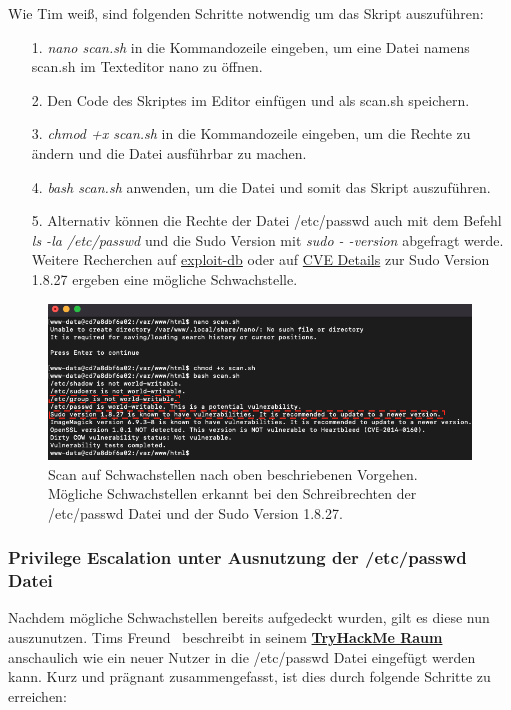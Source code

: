 \documentclass[10pt, a4paper,onecolumn ,titlepage]{article}
\begin{document}
    Wie Tim weiß, sind folgenden Schritte notwendig um das Skript auszuführen:
    \begin{enumerate}[leftmargin=2.5cm]
        \item[1.] \textit{nano scan.sh}  in die Kommandozeile eingeben, um eine Datei namens scan.sh im Texteditor nano zu öffnen.
        \item[2.] Den Code des Skriptes im Editor einfügen und als scan.sh speichern.
        \item[3.] \textit{chmod +x scan.sh}  in die Kommandozeile eingeben, um die Rechte zu ändern und die Datei ausführbar zu machen.
        \item[4.] \textit{bash scan.sh}  anwenden, um die Datei und somit das Skript auszuführen.
        \item[5.] Alternativ können die Rechte der Datei /etc/passwd auch mit dem Befehl \textit{ls -la /etc/passwd} und die Sudo Version mit \textit{sudo - -version} abgefragt werde.
        Weitere Recherchen auf \href{https://www.exploit-db.com/exploits/47502}{exploit-db} oder auf \href{https://www.cvedetails.com/cve/CVE-2019-14287/}{CVE Details} zur Sudo Version 1.8.27 ergeben eine mögliche Schwachstelle.
    \end{enumerate}


    \begin{figure}[H]
        \centering
        \includegraphics[width=1\textwidth]{storyline_bilder_vm2/ScanSchwachstellen}
        \caption{Scan auf Schwachstellen nach oben beschriebenen Vorgehen.
        Mögliche Schwachstellen erkannt bei den Schreibrechten der /etc/passwd Datei und der Sudo Version 1.8.27.}
        \label{fig:scan}
    \end{figure}
    \noindent



    \subsubsection{Privilege Escalation unter Ausnutzung der /etc/passwd Datei}
    \label{subsubsec:privilegeEscalation1}
    Nachdem mögliche Schwachstellen bereits aufgedeckt wurden, gilt es diese nun auszunutzen.
    Tims Freund~\textcite{privilegeEscalationRaumTryHackMe} beschreibt in seinem \href{https://tryhackme.com/room/linprivesc}{\textbf{TryHackMe Raum}} anschaulich wie ein neuer Nutzer in die /etc/passwd Datei eingefügt werden kann.
    Kurz und prägnant zusammengefasst, ist dies durch folgende Schritte zu erreichen:
\end{document}

